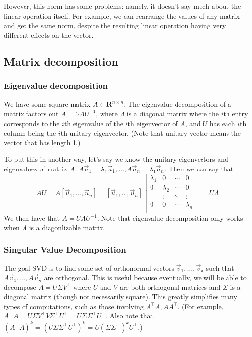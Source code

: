 \documentclass[answers,12pt]{exam}
\begin{document}
However, this norm has some problems: namely, it doesn't say much about the linear operation itself.
For example, we can rearrange the values of any matrix and get the same norm, despite the resulting linear operation having very different effects on the vector.


\subsection{Matrix decomposition}

\subsubsection{Eigenvalue decomposition}
We have some square matrix $A \in \mathbf{R}^{n \times n}$.
The eigenvalue decomposition of a matrix factors out $A = U \Lambda U^{-1}$, where $\Lambda$ is a diagonal matrix where the $i$th entry corresponds to the $i$th eigenvalue of the $i$th eigenvector of $A$, and $U$ has each $i$th column being the $i$th unitary eigenvector.
(Note that unitary vector means the vector that has length 1.)

To put this in another way, let's say we know the unitary eigenvectors and eigenvalues of matrix $A$: $A \vec{u}_1 = \lambda_1 \vec{u}_1, \dots, A \vec{u}_n = \lambda_1 \vec{u}_n$.
Then we can say that 
\[
    AU = A [\vec{u}_1, \dots, \vec{u}_n] = [\vec{u}_1, \dots, \vec{u}_n]
    \begin{bmatrix}
        \lambda_1 & 0 & \cdots & 0 \\
        0 & \lambda_2 & \cdots & 0 \\
        \vdots & \vdots & \ddots & \vdots \\
        0 & 0 & \cdots & \lambda_n \\
    \end{bmatrix}
    = U \Lambda
\]
We then have that $A = U \Lambda U^{-1}$.
Note that eigenvalue decomposition only works when $A$ is a diagonlizable matrix.


\subsubsection{Singular Value Decomposition}
The goal SVD is to find some set of orthonormal vectors $\vec{v}_1, \dots, \vec{v}_n$ such that $A \vec{v}_1, \dots, A \vec{v}_n$ are orthogonal.
This is useful because eventually, we will be able to decompose $A = U \Sigma V^{\top}$ where $U$ and $V$ are both orthogonal matrices and $\Sigma$ is a diagonal matrix (though not necessarily square).
This greatly simplifies many types of computations, such as those involving $A^{\top}A, AA^{\top}$.
(For example, $A^{\top}A = U \Sigma V^{\top} V \Sigma^{\top} U^{\top} = U \Sigma \Sigma^{\top} U^{\top}$.
Also note that ${(A^{\top}A)}^k = {(U \Sigma \Sigma^{\top} U^{\top})}^k = U {(\Sigma \Sigma^{\top})}^k U^{\top}$.)
\end{document}
